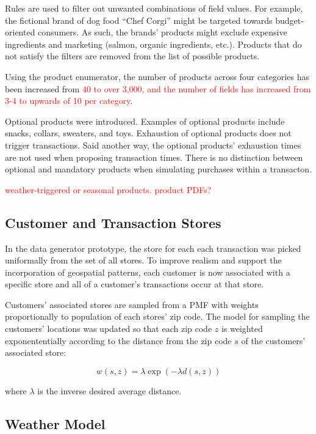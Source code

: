 \documentclass[conference]{IEEEtran}
\begin{document}
Rules are used to filter out unwanted combinations of field values.  For example, the fictional brand of dog food ``Chef Corgi'' might be targeted towards budget-oriented consumers.  As such, the brands' products might exclude expensive ingredients and marketing (salmon, organic ingredients, etc.).  Products that do not satisfy the filters are removed from the list of possible products.

Using the product enumerator, the number of products across four categories has been increased from \textcolor{red}{40 to over 3,000, and the number of fields has increased from 3-4 to upwards of 10 per category}.

Optional products were introduced.  Examples of optional products include snacks, collars, sweaters, and toys. Exhaustion of optional products does not trigger transactions.  Said another way, the optional products' exhaustion times are not used when proposing transaction times.  There is no distinction between optional and mandatory products when simulating purchases within a transacton.

\textcolor{red}{weather-triggered or seasonal products. product PDFs?}

\subsection{Customer and Transaction Stores}
In the data generator prototype, the store for each each transaction was picked uniformally from the set of all stores.  To improve realism and support the incorporation of geospatial patterns, each customer is now associated with a specific store and all of a customer's transactions occur at that store.

Customers' associated stores are sampled from a PMF with weights proportionally to population of each stores' zip code.  The model for sampling the customers' locations was updated so that each zip code $z$ is weighted exponententially according to the distance from the zip code $s$ of the customers' associated store:

\begin{equation}
w(s, z) = \lambda \exp(-\lambda d(s, z))
\end{equation}

where $\lambda$ is the inverse desired average distance.

\subsection{Weather Model}
\end{document}
